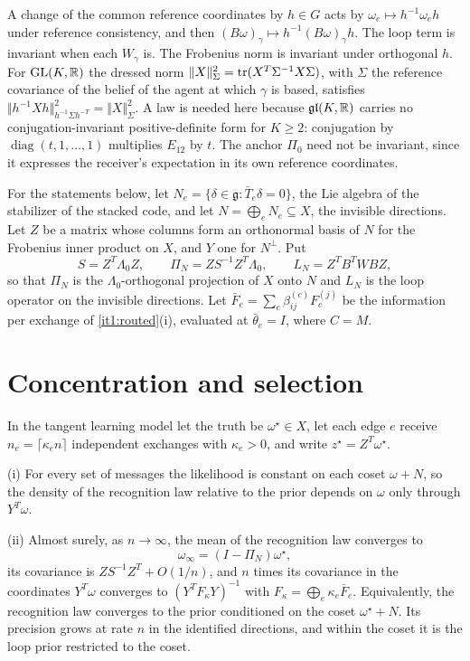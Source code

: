 \documentclass[11pt,letterpaper]{report}
\begin{document}
A change of the common reference coordinates by $h\in G$ acts by $\omega_e\mapsto h^{-1}\omega_eh$ under reference consistency, and then $(B\omega)_\gamma\mapsto h^{-1}(B\omega)_\gamma h$. The loop term is invariant when each $W_\gamma$ is. The Frobenius norm is invariant under orthogonal $h$. For $\mathrm{GL}(K,\mathbb R)$ the dressed norm $\Vert X\Vert_\Sigma^2=\operatorname{tr}(X^T\Sigma^{-1}X\Sigma)$, with $\Sigma$ the reference covariance of the belief of the agent at which $\gamma$ is based, satisfies $\Vert h^{-1}Xh\Vert^2_{h^{-1}\Sigma h^{-T}}=\Vert X\Vert^2_\Sigma$. A law is needed here because $\mathfrak{gl}(K,\mathbb R)$ carries no conjugation-invariant positive-definite form for $K\geq2$: conjugation by $\operatorname{diag}(t,1,\ldots,1)$ multiplies $E_{12}$ by $t$. The anchor $\Pi_0$ need not be invariant, since it expresses the receiver's expectation in its own reference coordinates.

For the statements below, let $N_e=\{\delta\in\mathfrak g:\bar T_e\delta=0\}$, the Lie algebra of the stabilizer of the stacked code, and let $N=\bigoplus_eN_e\subseteq X$, the invisible directions. Let $Z$ be a matrix whose columns form an orthonormal basis of $N$ for the Frobenius inner product on $X$, and $Y$ one for $N^\perp$. Put
\begin{equation}
S=Z^T\Lambda_0Z,\qquad
\Pi_N=ZS^{-1}Z^T\Lambda_0,\qquad
L_N=Z^TB^TWBZ,
\label{it1:learning-notation}
\end{equation}
so that $\Pi_N$ is the $\Lambda_0$-orthogonal projection of $X$ onto $N$ and $L_N$ is the loop operator on the invisible directions. Let $\bar F_e=\sum_c\beta^{(c)}_{ij}F_c^{(j)}$ be the information per exchange of \cref{it1:routed}(i), evaluated at $\bar\theta_e=I$, where $C=M$.

\section{Concentration and selection}

In the tangent learning model let the truth be $\omega^\star\in X$, let each edge $e$ receive $n_e=\lceil\kappa_en\rceil$ independent exchanges with $\kappa_e>0$, and write $z^\star=Z^T\omega^\star$.

\textup{(i)} For every set of messages the likelihood is constant on each coset $\omega+N$, so the density of the recognition law relative to the prior depends on $\omega$ only through $Y^T\omega$.

\textup{(ii)} Almost surely, as $n\to\infty$, the mean of the recognition law converges to
\begin{equation}
\omega_\infty=(I-\Pi_N)\omega^\star,
\label{it1:limit-mean}
\end{equation}
its covariance is $ZS^{-1}Z^T+O(1/n)$, and $n$ times its covariance in the coordinates $Y^T\omega$ converges to $(Y^TF_\kappa Y)^{-1}$ with $F_\kappa=\bigoplus_e\kappa_e\bar F_e$. Equivalently, the recognition law converges to the prior conditioned on the coset $\omega^\star+N$. Its precision grows at rate $n$ in the identified directions, and within the coset it is the loop prior restricted to the coset.
\end{document}
